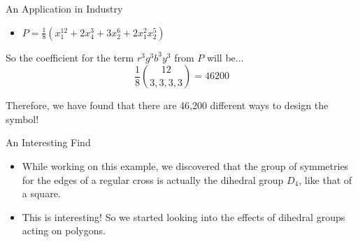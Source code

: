 \documentclass{beamer}
\begin{document}
\begin{frame}{An Application in Industry}
\begin{itemize}
\item $P = \frac{1}{8}(x_1^{12}+2x_4^3 +3x_2^6 +2x_1^2 x_2^5)$
\end{itemize}
So the coefficient for the term $r^3g^3b^3y^3$ from $P$ will be...\\

\[\frac{1}{8}{{12}\choose{3,3,3,3}}=46200\]

\vspace{40pt}
Therefore, we have found that there are 46,200 different ways to design the symbol!
\end{frame}

\begin{frame}{An Interesting Find}
\begin{itemize}
\item While working on this example, we discovered that the group of symmetries for the edges of a regular cross is actually the dihedral group $D_4$, like that of a square.
\item This is interesting! So we started looking into the effects of dihedral groups acting on polygons.
\end{itemize}
\end{frame}
\end{document}
